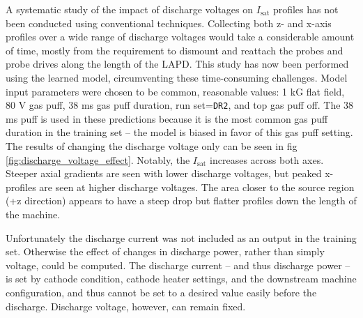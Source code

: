 
A systematic study of the impact of discharge voltages on $I_\text{sat}$ profiles has not been conducted using conventional techniques. Collecting both z- and x-axis profiles over a wide range of discharge voltages would take a considerable amount of time, mostly from the requirement to dismount and reattach the probes and probe drives along the length of the LAPD. This study has now been performed using the learned model, circumventing these time-consuming challenges. Model input parameters were chosen to be common, reasonable values: 1 kG flat field, 80 V gas puff, 38 ms gas puff duration, run set=\texttt{DR2}, and top gas puff off. The 38 ms puff is used in these predictions because it is the most common gas puff duration in the training set -- the model is biased in favor of this gas puff setting. The results of changing the discharge voltage only can be seen in fig \ref{fig:discharge_voltage_effect}. Notably, the $I_\text{sat}$ increases across both axes. Steeper axial gradients are seen with lower discharge voltages, but peaked x-profiles are seen at higher discharge voltages. The area closer to the source region (+z direction) appears to have a steep drop but flatter profiles down the length of the machine. 

 Unfortunately the discharge current was not included as an output in the training set. Otherwise the effect of changes in discharge power, rather than simply voltage, could be computed. The discharge current -- and thus discharge power -- is set by cathode condition, cathode heater settings, and the downstream machine configuration, and thus cannot be set to a desired value easily before the discharge. Discharge voltage, however, can remain fixed.

